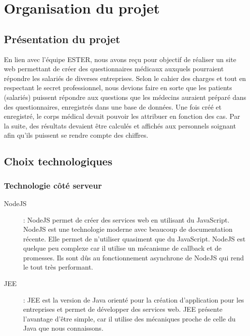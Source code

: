 \chapter{Organisation du projet}

\section{Présentation du projet}

En lien avec l'équipe ESTER, nous avons reçu pour objectif de réaliser un site web permettant de créer des questionnaires médicaux auxquels pourraient répondre les salariés de diverses entreprises. Selon le cahier des charges et tout en respectant le secret professionnel, nous devions faire en sorte que les patients (salariés) puissent répondre aux questions que les médecins auraient préparé dans des questionnaires, enregistrés dans une base de données. Une fois créé et enregistré, le corps médical devait pouvoir les attribuer en fonction des cas. Par la suite, des résultats devaient être calculés et affichés aux personnels soignant afin qu'ils puissent se rendre compte des chiffres. 

\section{Choix technologiques}

\subsection{Technologie côté serveur}

\begin{description}

\item[NodeJS] : NodeJS permet de créer des services web en utilisant du JavaScript. 
NodeJS est une technologie moderne avec beaucoup de documentation récente. Elle permet de n'utiliser quasiment que du JavaScript. NodeJS est quelque peu complexe car il utilise un mécanisme de callback et de promesses. Ils sont dûs au fonctionnement asynchrone de NodeJS qui rend le tout très performant.

\item[JEE] : JEE est la version de Java orienté pour la création d'application pour les entreprises et permet de développer des services web.
JEE présente l'avantage d'être simple, car il utilise des mécaniques proche de celle du Java que nous connaissons. 

\end{description}

